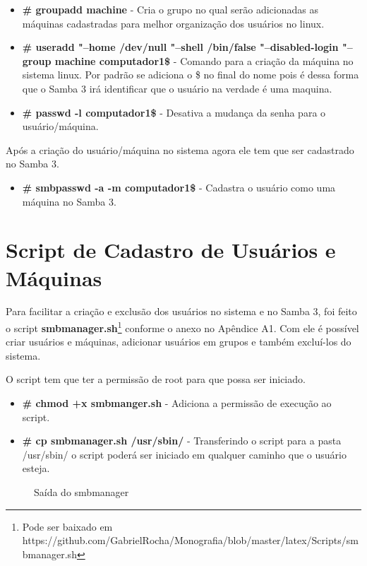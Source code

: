 \begin{itemize}
	\item \textbf{\# groupadd machine} - Cria o grupo no qual serão adicionadas as máquinas cadastradas para melhor organização dos usuários no linux.
	\item \textbf{\# useradd "--home /dev/null "--shell /bin/false "--disabled-login "--group machine computador1\$} - 	Comando para a criação da máquina no sistema linux. Por padrão se adiciona o \$ no final do nome pois é dessa forma que o Samba 3 irá identificar que o usuário na verdade é uma maquina. 
	\item \textbf{\# passwd -l computador1\$} - Desativa a mudança da senha para o usuário/máquina.
\end{itemize}

Após a criação do usuário/máquina no sistema agora ele tem que ser cadastrado no Samba 3.

\begin{itemize}	
	\item \textbf{\# smbpasswd -a -m computador1\$} - Cadastra o usuário como uma máquina no Samba 3.
\end{itemize}


\section{Script de Cadastro de Usuários e Máquinas}

Para facilitar a criação e exclusão dos usuários no sistema e no Samba 3, foi feito o script \textbf{smbmanager.sh}\footnote[1]{Pode ser baixado em https://github.com/GabrielRocha/Monografia/blob/master/latex/Scripts/smbmanager.sh} conforme o anexo no Apêndice A1. Com ele é possível criar usuários e máquinas, adicionar usuários em grupos e também excluí-los do sistema.

O script tem que ter a permissão de root para que possa ser iniciado.

\begin{itemize}
	\item \textbf{\# chmod +x smbmanger.sh} - Adiciona a permissão de execução ao script.
	\item \textbf{\# cp smbmanager.sh /usr/sbin/} - Transferindo o script para a pasta /usr/sbin/ o script poderá ser iniciado em qualquer caminho que o usuário esteja.
\end{itemize}

\begin{figure}[ht]
   	\centering
   	\caption{Saída do smbmanager}
    \label{smbmanager}
\end{figure}


